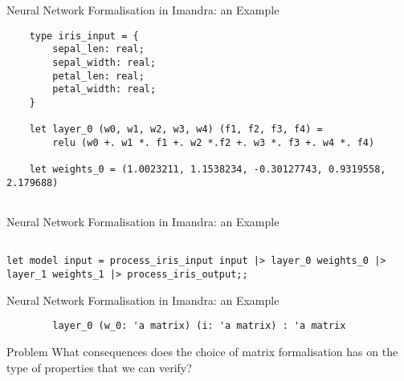 \documentclass[handout]{beamer}
\begin{document}
\begin{frame}[fragile]{Neural Network Formalisation in Imandra: an Example}
	\begin{lstlisting}
	type iris_input = {
		sepal_len: real;
		sepal_width: real;
		petal_len: real;
		petal_width: real;
	}
	
	let layer_0 (w0, w1, w2, w3, w4) (f1, f2, f3, f4) =
		relu (w0 +. w1 *. f1 +. w2 *.f2 +. w3 *. f3 +. w4 *. f4)
		
	let weights_0 = (1.0023211, 1.1538234, -0.30127743, 0.9319558, 2.179688)
	
	\end{lstlisting}

\end{frame}

\begin{frame}[fragile]{Neural Network Formalisation in Imandra: an Example}
	\begin{lstlisting}

let model input = process_iris_input input |> layer_0 weights_0 |> layer_1 weights_1 |> process_iris_output;;
	\end{lstlisting}
\end{frame}


\begin{frame}[fragile]{Neural Network Formalisation in Imandra: an Example}
	\begin{lstlisting}
		layer_0 (w_0: 'a matrix) (i: 'a matrix) : 'a matrix
	\end{lstlisting}
\end{frame}

\begin{frame}
	\begin{block}{Problem}
		What consequences does the choice of matrix formalisation has on the type of properties that we can verify?
	\end{block}
\end{frame}
\end{document}
